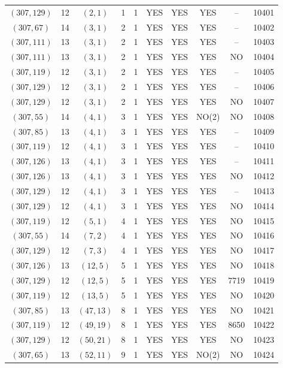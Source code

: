 \begin{longtable}{|c|c|c|c|c|c|c|c|c|c|}
$(307, 129)$ & 12 & $(2, 1)$ & 1 & 1 & YES & YES & YES & -- & 10401\\
$(307, 67)$ & 14 & $(3, 1)$ & 2 & 1 & YES & YES & YES & -- & 10402\\
$(307, 111)$ & 13 & $(3, 1)$ & 2 & 1 & YES & YES & YES & -- & 10403\\
$(307, 111)$ & 13 & $(3, 1)$ & 2 & 1 & YES & YES & YES & NO & 10404\\
$(307, 119)$ & 12 & $(3, 1)$ & 2 & 1 & YES & YES & YES & -- & 10405\\
$(307, 129)$ & 12 & $(3, 1)$ & 2 & 1 & YES & YES & YES & -- & 10406\\
$(307, 129)$ & 12 & $(3, 1)$ & 2 & 1 & YES & YES & YES & NO & 10407\\
$(307, 55)$ & 14 & $(4, 1)$ & 3 & 1 & YES & YES & NO(2) & NO & 10408\\
$(307, 85)$ & 13 & $(4, 1)$ & 3 & 1 & YES & YES & YES & -- & 10409\\
$(307, 119)$ & 12 & $(4, 1)$ & 3 & 1 & YES & YES & YES & -- & 10410\\
$(307, 126)$ & 13 & $(4, 1)$ & 3 & 1 & YES & YES & YES & -- & 10411\\
$(307, 126)$ & 13 & $(4, 1)$ & 3 & 1 & YES & YES & YES & NO & 10412\\
$(307, 129)$ & 12 & $(4, 1)$ & 3 & 1 & YES & YES & YES & -- & 10413\\
$(307, 129)$ & 12 & $(4, 1)$ & 3 & 1 & YES & YES & YES & NO & 10414\\
$(307, 119)$ & 12 & $(5, 1)$ & 4 & 1 & YES & YES & YES & NO & 10415\\
$(307, 55)$ & 14 & $(7, 2)$ & 4 & 1 & YES & YES & YES & NO & 10416\\
$(307, 129)$ & 12 & $(7, 3)$ & 4 & 1 & YES & YES & YES & NO & 10417\\
$(307, 126)$ & 13 & $(12, 5)$ & 5 & 1 & YES & YES & YES & NO & 10418\\
$(307, 129)$ & 12 & $(12, 5)$ & 5 & 1 & YES & YES & YES & 7719 & 10419\\
$(307, 119)$ & 12 & $(13, 5)$ & 5 & 1 & YES & YES & YES & NO & 10420\\
$(307, 85)$ & 13 & $(47, 13)$ & 8 & 1 & YES & YES & YES & NO & 10421\\
$(307, 119)$ & 12 & $(49, 19)$ & 8 & 1 & YES & YES & YES & 8650 & 10422\\
$(307, 129)$ & 12 & $(50, 21)$ & 8 & 1 & YES & YES & YES & NO & 10423\\
$(307, 65)$ & 13 & $(52, 11)$ & 9 & 1 & YES & YES & NO(2) & NO & 10424\\

\end{longtable}

